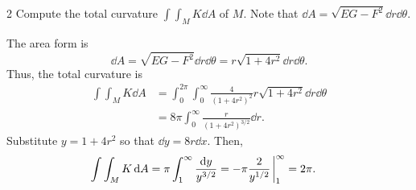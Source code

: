 \documentclass[11pt]{article}
\begin{document}
\begin{problem}{2}
  Compute the total curvature \( \int\int_M K \dd{A} \) of \( M \).
  Note that \( \dd{A} = \sqrt{EG - F^2}\dd{r}\dd{\theta} \).
\end{problem}
\begin{answer}
  The area form is
  \begin{equation}
  \label{eq:4}
  \dd{A} = \sqrt{EG - F^2}\dd{r}\dd{\theta} = r \sqrt{1 + 4r^2}\dd{r}\dd{\theta}.
\end{equation}
Thus, the total curvature is
\begin{equation}
\label{eq:5}
\begin{aligned}
  \int\int_M K \dd{A} &= \int_0^{2\pi}\int_0^{\infty} \frac{4}{(1+4r^2)^2} r \sqrt{1 + 4r^2}\dd{r}\dd{\theta} \\
  &= 8\pi \int_0^{\infty} \frac{r}{(1 + 4r^2)^{3/2}}\dd{r}.
\end{aligned}
\end{equation}
Substitute \( y = 1 + 4r^2 \) so that \( \dd{y} = 8r\dd{x} \).
Then,
\begin{equation}
\label{eq:6}
\begin{aligned}
\int\int_M K \dd{A} &= \pi \int_1^{\infty} \frac{\dd{y}}{y^{3/2}} = -\pi\frac{2}{y^{1/2}}\eval_1^{\infty} = 2\pi.
\end{aligned}
\end{equation}
\end{answer}
\end{document}
